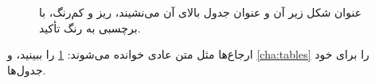 \begin{figure}[htbp]
  \centering
  \caption{عنوان شکل زیر آن و عنوان جدول بالای آن می‌نشیند، ریز و کم‌رنگ، با
    برچسبی به رنگ تأکید.}
  \label{fig:placeholder}
\end{figure}

ارجاع‌ها مثل متن عادی خوانده می‌شوند: \cref{fig:placeholder} را ببینید، و
\cref{cha:tables} را برای خود جدول‌ها.
\label{cha:tables}
